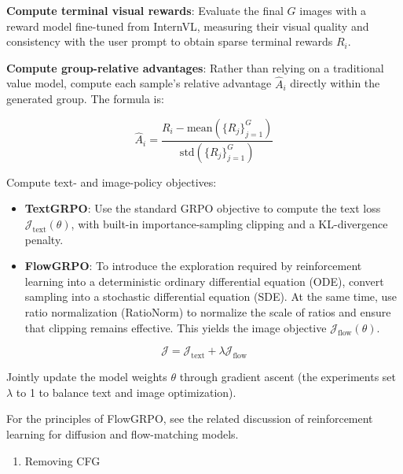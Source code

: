 \textbf{Compute terminal visual rewards}: Evaluate the final \(G\) images with a reward model fine-tuned from InternVL, measuring their visual quality and consistency with the user prompt to obtain sparse terminal rewards \(R_i\).

\textbf{Compute group-relative advantages}: Rather than relying on a traditional value model, compute each sample's relative advantage \(\hat A_i\) directly within the generated group. The formula is:

\[
\hat A_i=
\frac{R_i-\mathrm{mean}(\{R_j\}_{j=1}^{G})}
{\mathrm{std}(\{R_j\}_{j=1}^{G})}
\]

Compute text- and image-policy objectives:

\begin{itemize}
\tightlist
\item
  \textbf{TextGRPO}: Use the standard GRPO objective to compute the text loss \(\mathcal{J}_{\mathrm{text}}(\theta)\), with built-in importance-sampling clipping and a KL-divergence penalty.
\item
  \textbf{FlowGRPO}: To introduce the exploration required by reinforcement learning into a deterministic ordinary differential equation (ODE), convert sampling into a stochastic differential equation (SDE). At the same time, use ratio normalization (RatioNorm) to normalize the scale of ratios and ensure that clipping remains effective. This yields the image objective \(\mathcal{J}_{\mathrm{flow}}(\theta)\).
\end{itemize}

\[
\mathcal{J}
=\mathcal{J}_{\mathrm{text}}+\lambda\mathcal{J}_{\mathrm{flow}}
\]

Jointly update the model weights \(\theta\) through gradient ascent (the experiments set \(\lambda\) to 1 to balance text and image optimization).

For the principles of FlowGRPO, see the related discussion of reinforcement learning for diffusion and flow-matching models.

\begin{enumerate}
\def\labelenumi{\arabic{enumi}.}
\setcounter{enumi}{2}
\tightlist
\item
  Removing CFG
\end{enumerate}

